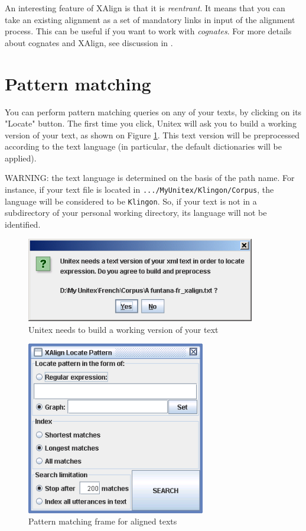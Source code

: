 \bigskip
\noindent An interesting feature of XAlign is that it is
\textit{reentrant}. It means that you can take an
existing alignment as a set of mandatory links in input of the alignment
process. This can be useful if you want to work with
\textit{cognates}. For more details about cognates and XAlign,
see discussion in \cite{IGML_PauDum08}.

\clearpage
\section{Pattern matching}
You can perform pattern matching queries on any of your texts, by clicking on
its "Locate" button. The first time you click, Unitex will ask you to build a
working version of your text, as shown on Figure \ref{fig-x-fig6}. This text
version will be preprocessed according to the text language (in particular,
the default dictionaries will be applied).

\bigskip
\noindent WARNING: the text language is determined on the basis of the path
name. For instance, if your text file is located in \verb+.../MyUnitex/Klingon/Corpus+, 
the language will be considered to be \verb+Klingon+. So, if your text is not
in a subdirectory of your personal working directory,
its language will not be identified.

\begin{figure}[!ht]
\begin{center}
\includegraphics[width=10cm]{resources/img/figX-6.png}
\caption{Unitex needs to build a working version of your text\label{fig-x-fig6}}
\end{center}
\end{figure}
 
\begin{figure}[!ht]
\begin{center}
\includegraphics[width=7.8cm]{resources/img/figX-7.png}
\caption{Pattern matching frame for aligned texts\label{fig-x-locate-frame}}
\end{center}
\end{figure}

